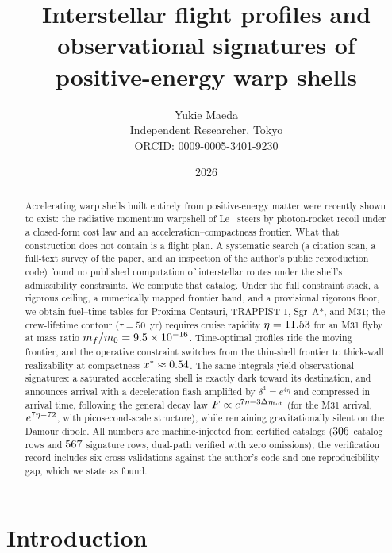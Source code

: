 \documentclass[11pt]{article}
\title{Interstellar flight profiles and observational signatures of\\
positive-energy warp shells}
\author{Yukie Maeda\\ \small Independent Researcher, Tokyo\\
\small ORCID: 0009-0005-3401-9230}
\date{2026}
\begin{document}
\maketitle

\begin{abstract}
Accelerating warp shells built entirely from positive-energy matter were
recently shown to exist: the radiative momentum warpshell of
Le~\cite{le-steering} steers by photon-rocket recoil under a closed-form
cost law and an acceleration--compactness frontier. What that construction
does not contain is a flight plan. A systematic search (a citation scan, a
full-text survey of the paper, and an inspection of the author's public
reproduction code) found no published computation of interstellar routes
under the shell's admissibility constraints. We compute that catalog. Under
the full constraint stack, a rigorous ceiling, a numerically mapped
frontier band, and a provisional rigorous floor, we obtain fuel--time
tables for Proxima Centauri, TRAPPIST-1, Sgr~A*, and M31; the crew-lifetime
contour ($\tau = 50$~yr) requires cruise rapidity $\eta = 11.53$ for an
M31 flyby at mass ratio $m_f/m_0 = 9.5\times10^{-16}$. Time-optimal profiles ride
the moving frontier, and the operative constraint switches from the
thin-shell frontier to thick-wall realizability at compactness
$x^* \approx 0.54$. The same integrals yield observational signatures:
a saturated accelerating shell is exactly dark toward its destination, and
announces arrival with a deceleration flash amplified by $\delta^4 =
e^{4\eta}$ and compressed in arrival time, following the general decay law
$F \propto e^{7\eta - 3\Delta\eta_{\rm tot}}$ (for the M31 arrival,
$e^{7\eta-72}$, with picosecond-scale structure), while remaining
gravitationally silent on the Damour dipole. All numbers are
machine-injected from certified catalogs ($306$ catalog rows and
$567$ signature rows, dual-path verified with zero omissions); the
verification record includes six cross-validations against the author's
code and one reproducibility gap, which we state as found.
\end{abstract}

\section{Introduction}\label{sec:intro}
\end{document}
